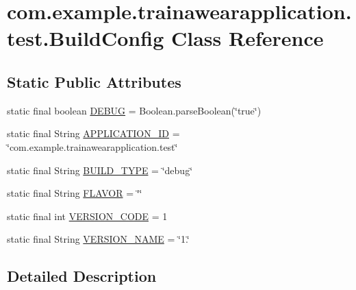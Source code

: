 \hypertarget{classcom_1_1example_1_1trainawearapplication_1_1test_1_1_build_config}{}\section{com.\+example.\+trainawearapplication.\+test.\+Build\+Config Class Reference}
\label{classcom_1_1example_1_1trainawearapplication_1_1test_1_1_build_config}
\subsection*{Static Public Attributes}
\begin{DoxyCompactItemize}
\item 
static final boolean \mbox{\hyperlink{classcom_1_1example_1_1trainawearapplication_1_1test_1_1_build_config_a32cd68e112f118c38d8a854b8620b4b2}{D\+E\+B\+UG}} = Boolean.\+parse\+Boolean(\char`\"{}true\char`\"{})
\item 
static final String \mbox{\hyperlink{classcom_1_1example_1_1trainawearapplication_1_1test_1_1_build_config_abadb9fd8b9e125a8eb1d678a99678d77}{A\+P\+P\+L\+I\+C\+A\+T\+I\+O\+N\+\_\+\+ID}} = \char`\"{}com.\+example.\+trainawearapplication.\+test\char`\"{}
\item 
static final String \mbox{\hyperlink{classcom_1_1example_1_1trainawearapplication_1_1test_1_1_build_config_a52c77a7d7bdc901aebbcd7119e55ba3d}{B\+U\+I\+L\+D\+\_\+\+T\+Y\+PE}} = \char`\"{}debug\char`\"{}
\item 
static final String \mbox{\hyperlink{classcom_1_1example_1_1trainawearapplication_1_1test_1_1_build_config_a8b53b8920979414e8dffb3d96a248c30}{F\+L\+A\+V\+OR}} = \char`\"{}\char`\"{}
\item 
static final int \mbox{\hyperlink{classcom_1_1example_1_1trainawearapplication_1_1test_1_1_build_config_a31640503e98b03ca61350d9521a6fde5}{V\+E\+R\+S\+I\+O\+N\+\_\+\+C\+O\+DE}} = 1
\item 
static final String \mbox{\hyperlink{classcom_1_1example_1_1trainawearapplication_1_1test_1_1_build_config_a5fa12283f4edf2ef20309a8a557d5614}{V\+E\+R\+S\+I\+O\+N\+\_\+\+N\+A\+ME}} = \char`\"{}1.\char`\"{}
\end{DoxyCompactItemize}


\subsection{Detailed Description}


